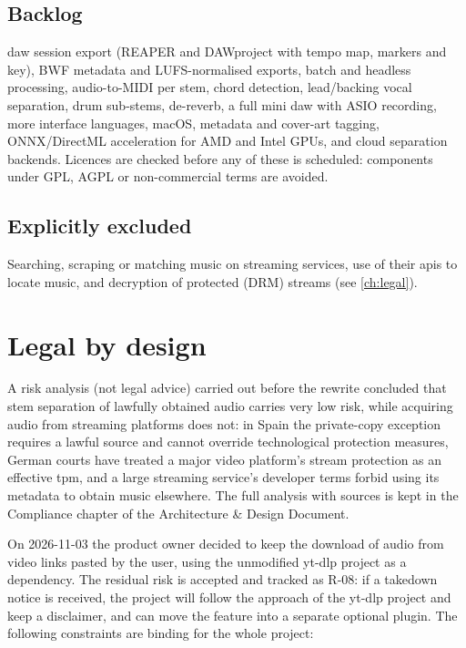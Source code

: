 \documentclass{covermaker}
\begin{document}
\section{Backlog}
\gls{daw} session export (REAPER and DAWproject with tempo map, markers and
key), BWF metadata and LUFS-normalised exports, batch and headless processing,
audio-to-MIDI per stem, chord detection, lead/backing vocal separation, drum
sub-stems, de-reverb, a full mini \gls{daw} with ASIO recording, more interface
languages, macOS, metadata and cover-art tagging, ONNX/DirectML acceleration
for AMD and Intel GPUs, and cloud separation backends. Licences are checked
before any of these is scheduled: components under GPL, AGPL or
non-commercial terms are avoided.

\section{Explicitly excluded}
Searching, scraping or matching music on streaming services, use of their
\glspl{api} to locate music, and decryption of protected (DRM) streams (see
\autoref{ch:legal}).

\chapter{Legal by design}\label{ch:legal}
A risk analysis (not legal advice) carried out before the rewrite concluded that
stem separation of lawfully obtained audio carries very low risk, while
acquiring audio from streaming platforms does not: in Spain the private-copy
exception requires a lawful source and cannot override technological protection
measures, German courts have treated a major video platform's stream protection
as an effective \gls{tpm}, and a large streaming service's developer terms
forbid using its metadata to obtain music elsewhere. The full analysis with
sources is kept in the Compliance chapter of the Architecture \& Design
Document.

On 2026-11-03 the product owner decided to keep the download of audio from
video links pasted by the user, using the unmodified yt-dlp project as a
dependency. The residual risk is accepted and tracked as R-08: if a takedown
notice is received, the project will follow the approach of the yt-dlp project
and keep a disclaimer, and can move the feature into a separate optional plugin.
The following constraints are binding for the whole project:


\end{document}
